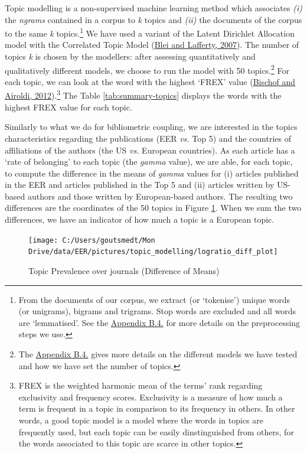 \documentclass[]{elsarticle} %
\begin{document}
Topic modelling is a non-supervised machine learning method which
associates \emph{(i)} the \emph{ngrams} contained in a corpus to
\emph{k} topics and \emph{(ii)} the documents of the corpus to the same
\emph{k} topics.\footnote{From the documents of our corpus, we extract
  (or `tokenise') unique words (or unigrams), bigrams and trigrams. Stop
  words are excluded and all words are `lemmatised'. See the
  \protect\hyperlink{topic}{Appendix B.4.} for more details on the
  preprocessing steps we use.} We have used a variant of the Latent
Dirichlet Allocation model with the Correlated Topic Model
(\protect\hyperlink{ref-blei2007}{Blei and Lafferty, 2007}). The number
of topics \emph{k} is chosen by the modellers: after assessing
quantitatively and qualitatively different models, we choose to run the
model with 50 topics.\footnote{The \protect\hyperlink{topic}{Appendix
  B.4.} gives more details on the different models we have tested and
  how we have set the number of topics.} For each topic, we can look at
the word with the highest `FREX' value
(\protect\hyperlink{ref-bischof2012}{Bischof and Airoldi,
2012}).\footnote{FREX is the weighted harmonic mean of the terms' rank
  regarding exclusivity and frequency scores. Exclusivity is a measure
  of how much a term is frequent in a topic in comparison to its
  frequency in others. In other words, a good topic model is a model
  where the words in topics are frequently used, but each topic can be
  easily dinstinguished from others, for the words associated to this
  topic are scarce in other topics.} The Table \ref{tab:summary-topics}
displays the words with the highest FREX value for each topic.

Similarly to what we do for bibliometric coupling, we are interested in
the topics characteristics regarding the publications (EER \emph{vs.}
Top 5) and the countries of affiliations of the authors (the US
\emph{vs.} European countries). As each article has a `rate of
belonging' to each topic (the \emph{gamma} value), we are able, for each
topic, to compute the difference in the means of \emph{gamma} values for
(i) articles published in the EER and articles published in the Top 5
and (ii) articles written by US-based authors and those written by
European-based authors. The resulting two differences are the
coordinates of the 50 topics in Figure \ref{fig:plot-topic-diff}. When
we sum the two differences, we have an indicator of how much a topic is
a European topic.

\begin{figure}[h]

{\centering \texttt{[image: C:/Users/goutsmedt/Mon Drive/data/EER/pictures/topic\_modelling/logratio\_diff\_plot]} 

}

\caption{Topic Prevalence over journals (Difference of Means)}\label{fig:plot-topic-diff}
\end{figure}
\end{document}
